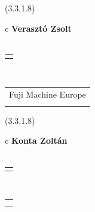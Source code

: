 \documentclass[11pt]{article}
\begin{document}
\makebox(3.3,1.8){
  \renewcommand\arraystretch{1.3}
  \begin{tabular}[c]{c}
    \hspace{8.5mm}
    \LARGE\bf{ Verasztó Zsolt }\\
    \hspace{8.5mm}
    \Large{  }\\
    \renewcommand\arraystretch{3}
    \begin{tabular}[c]{c}
      \centering
      \fontfamily{phv}\selectfont{
        \textbf{
          \textsc{
            \scriptsize{
            \color{Dark}{ Ismerkedő }\color{Bright}{ Webmester }\color{Bright}{ Sminkmester }\color{Bright}{ Programozó }
            }
          }
        }
      }
    \end{tabular}
    \\
    \renewcommand\arraystretch{1}
    \begin{tabular}{p{3.3in}}
      \hspace{.7cm}Fuji Machine Europe\\
      \hspace{.7cm}\emph{  }\\
    \end{tabular}
  \end{tabular}
}

\makebox(3.3,1.8){
  \renewcommand\arraystretch{1.3}
  \begin{tabular}[c]{c}
    \hspace{8.5mm}
    \LARGE\bf{ Konta Zoltán }\\
    \hspace{8.5mm}
    \Large{  }\\
    \renewcommand\arraystretch{3}
    \begin{tabular}[c]{c}
      \centering
      \fontfamily{phv}\selectfont{
        \textbf{
          \textsc{
            \scriptsize{
            \color{Bright}{ Ismerkedő }\color{Dark}{ Webmester }\color{Bright}{ Sminkmester }\color{Bright}{ Programozó }
            }
          }
        }
      }
    \end{tabular}
    \\
    \renewcommand\arraystretch{1}
    \begin{tabular}{p{3.3in}}
      \hspace{.7cm}\\
      \hspace{.7cm}\emph{  }\\
    \end{tabular}
  \end{tabular}
}
\end{document}
